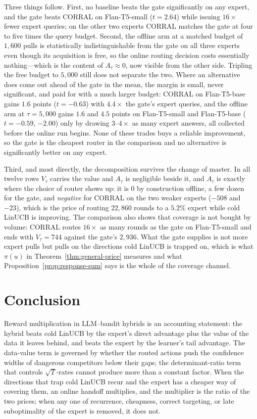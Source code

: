 \documentclass{article}
\theoremstyle{definition}
\theoremstyle{remark}
\theoremstyle{remark}
\begin{document}
Three things follow. First, no baseline beats the gate significantly on any
expert, and the gate beats CORRAL on Flan-T5-small ($t=2.64$) while issuing
$16\times$ fewer expert queries; on the other two experts CORRAL matches the
gate at four to five times the query budget. Second, the offline arm at a
matched budget of $1{,}600$ pulls is statistically indistinguishable from the
gate on all three experts even though its acquisition is free, so the online
routing decision costs essentially nothing---which is the content of
$A_\tau\approx0$, now visible from the other side. Tripling the free budget to
$5{,}000$ still does not separate the two. Where an alternative does come out
ahead of the gate in the mean, the margin is small, never significant, and
paid for with a much larger budget: CORRAL on Flan-T5-base gains $1.6$
points ($t=-0.63$) with $4.4\times$ the gate's expert queries, and the
offline arm at $\tau=5{,}000$ gains $1.6$ and $4.5$ points on Flan-T5-small
and Flan-T5-base ($t=-0.59$, $-2.00$) only by drawing $3$--$4\times$ as many
expert answers, all collected before the online run begins. None of these
trades buys a reliable improvement, so the gate is the cheapest router in
the comparison and no alternative is significantly better on any expert.

Third, and most directly, the decomposition survives the change of master. In
all twelve rows $V_\tau$ carries the value and $A_\tau$ is negligible beside
it, and $A_\tau$ is exactly where the choice of router shows up: it is $0$ by
construction offline, a few dozen for the gate, and \emph{negative} for CORRAL
on the two weaker experts ($-508$ and $-23$), which is the price of routing
$22{,}860$ rounds to a $5.2\%$ expert while cold LinUCB is improving. The
comparison also shows that coverage is not bought by volume: CORRAL routes
$16\times$ as many rounds as the gate on Flan-T5-small and ends with
$V_\tau=744$ against the gate's $2{,}936$. What the gate supplies is not more
expert pulls but pulls on the directions cold LinUCB is trapped on, which is
what $\pi(u)$ in Theorem~\ref{thm:general-price} measures and what
Proposition~\ref{prop:response-sum} says is the whole of the coverage channel.

\section{Conclusion}
\label{sec:conclusion}

Reward multiplication in LLM--bandit hybrids is an accounting statement: the
hybrid beats cold LinUCB by the expert's direct advantage plus the value of the
data it leaves behind, and beats the expert by the learner's tail advantage.
The data-value term is governed by whether the routed actions push the
confidence widths of dangerous competitors below their gaps; the
determinant-ratio term that controls $\sqrt T$-rates cannot produce more than
a constant factor. When the directions that trap cold LinUCB recur and the
expert has a cheaper way of covering them, an online handoff multiplies, and
the multiplier is the ratio of the two prices; when any one of recurrence,
cheapness, correct targeting, or late suboptimality of the expert is removed,
it does not.
\end{document}
